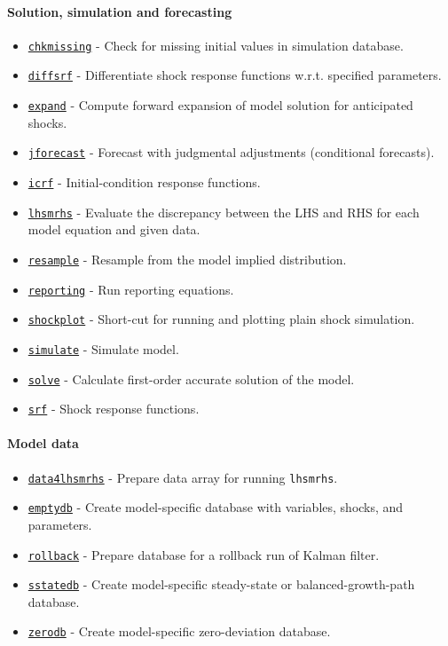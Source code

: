  \paragraph{Solution, simulation and forecasting}
 
 \begin{itemize}
 \item
   \href{model/chkmissing}{\texttt{chkmissing}} - Check for missing
   initial values in simulation database.
 \item
   \href{model/diffsrf}{\texttt{diffsrf}} - Differentiate shock response
   functions w.r.t. specified parameters.
 \item
   \href{model/expand}{\texttt{expand}} - Compute forward expansion of
   model solution for anticipated shocks.
 \item
   \href{model/jforecast}{\texttt{jforecast}} - Forecast with judgmental
   adjustments (conditional forecasts).
 \item
   \href{model/icrf}{\texttt{icrf}} - Initial-condition response
   functions.
 \item
   \href{model/lhsmrhs}{\texttt{lhsmrhs}} - Evaluate the discrepancy
   between the LHS and RHS for each model equation and given data.
 \item
   \href{model/resample}{\texttt{resample}} - Resample from the model
   implied distribution.
 \item
   \href{model/reporting}{\texttt{reporting}} - Run reporting equations.
 \item
   \href{model/shockplot}{\texttt{shockplot}} - Short-cut for running and
   plotting plain shock simulation.
 \item
   \href{model/simulate}{\texttt{simulate}} - Simulate model.
 \item
   \href{model/solve}{\texttt{solve}} - Calculate first-order accurate
   solution of the model.
 \item
   \href{model/srf}{\texttt{srf}} - Shock response functions.
 \end{itemize}
 
 \paragraph{Model data}
 
 \begin{itemize}
 \item
   \href{model/data4lhsmrhs}{\texttt{data4lhsmrhs}} - Prepare data array
   for running \texttt{lhsmrhs}.
 \item
   \href{model/emptydb}{\texttt{emptydb}} - Create model-specific
   database with variables, shocks, and parameters.
 \item
   \href{model/rollback}{\texttt{rollback}} - Prepare database for a
   rollback run of Kalman filter.
 \item
   \href{model/sstatedb}{\texttt{sstatedb}} - Create model-specific
   steady-state or balanced-growth-path database.
 \item
   \href{model/zerodb}{\texttt{zerodb}} - Create model-specific
   zero-deviation database.
 \end{itemize}
 
